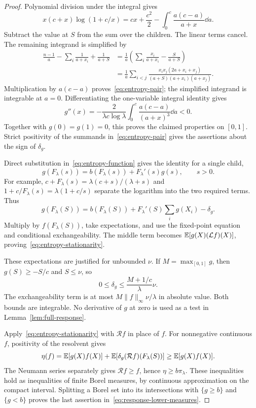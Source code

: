 \begin{proof}
Polynomial division under the integral gives
\[
 x(c+x)\log(1+c/x)
 =cx+\frac{c^2}{2}-\int_0^c\frac{a(c-a)}{a+x}\dd a.
\]
Subtract the value at $S$ from the sum over the children. The linear terms cancel. The remaining integrand is simplified by
\begin{align*}
 \frac{n-1}{a}-\sum_i\frac1{a+x_i}+\frac1{a+S}
 &=\frac1a\left(\sum_i\frac{x_i}{a+x_i}-\frac{S}{a+S}\right)\\
 &=\frac1a\sum_{i<j}
 \frac{x_ix_j(2a+x_i+x_j)}{(a+S)(a+x_i)(a+x_j)}.
\end{align*}
Multiplication by $a(c-a)$ proves~\eqref{eq:entropy-pair}; the simplified integrand is integrable at $a=0$. Differentiating the one-variable integral identity gives
\[
 g''(x)=-\frac2{\lambda c\log\lambda}
 \int_0^c\frac{a(c-a)}{(a+x)^3}\dd a<0.
\]
Together with $g(0)=g(1)=0$, this proves the claimed properties on $[0,1]$. Strict positivity of the summands in~\eqref{eq:entropy-pair} gives the assertions about the sign of $\delta_g$.

Direct substitution in~\eqref{eq:entropy-function} gives the identity for a single child,
\[
 g(F_\lambda(s))=b(F_\lambda(s))+F_\lambda'(s)g(s),\qquad s>0.
\]
For example, $c+F_\lambda(s)=\lambda(c+s)/(\lambda+s)$ and
$1+c/F_\lambda(s)=\lambda(1+c/s)$ separate the logarithm into the two required terms. Thus
\[
 g(F_\lambda(S))
 =b(F_\lambda(S))+F_\lambda'(S)\sum_i g(X_i)-\delta_g.
\]
Multiply by $f(F_\lambda(S))$, take expectations, and use the fixed-point equation and conditional exchangeability. The middle term becomes $\mathbb E[g(X)(\mathcal L f)(X)]$, proving~\eqref{eq:entropy-stationarity}.

These expectations are justified for unbounded $\nu$. If $M=\max_{[0,1]}g$, then $g(S)\ge-S/c$ and $S\le\nu$, so
\begin{equation}\label{eq:entropy-integrability}
 0\le\delta_g\le\frac{M+1/c}{\lambda}\nu.
\end{equation}
The exchangeability term is at most $M\|f\|_\infty\nu/\lambda$ in absolute value. Both bounds are integrable. No derivative of $g$ at zero is used as a test in Lemma~\ref{lem:full-response}.

Apply~\eqref{eq:entropy-stationarity} with $\mathcal R f$ in place of $f$. For nonnegative continuous $f$, positivity of the resolvent gives
\[
 \eta(f)=\mathbb E[g(X)f(X)]+\mathbb E[\delta_g(\mathcal Rf)(F_\lambda(S))]
 \ge\mathbb E[g(X)f(X)].
\]
The Neumann series separately gives $\mathcal R f\ge f$, hence $\eta\ge b\pi_\lambda$. These inequalities hold as inequalities of finite Borel measures, by continuous approximation on the compact interval. Splitting a Borel set into its intersections with $\{g\ge b\}$ and $\{g<b\}$ proves the last assertion in~\eqref{eq:response-lower-measures}.
\end{proof}

